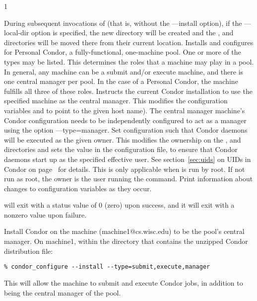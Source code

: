 \begin{ManPage}{\label{man-condor-configure}}{1}
\begin{Options}
{	During subsequent invocations of 
	(that is, without the ---install option),
	if the ---local-dir option is specified, the new directory
	will be created and the ,  and  
	directories will be moved there from their current location.}
	 {Installs and configures for 
	  Personal Condor, a fully-functional, one-machine pool}.
	 {One
	or more of the types may be listed.
	This determines the roles that a machine may play in a pool.
	In general, any machine can be a submit and/or execute machine,
	and there is one central manager per pool.
	In the case of a Personal Condor,
	the machine fulfills all three of these roles.}
	 {Instructs
	the current Condor installation to use the specified machine
	as the central manager. 
	This modifies the configuration variables 
	and  to point to the given host name).
	The central manager machine's Condor configuration needs
	to be independently configured to 
	act as a manager using the option ---type=manager. }
	 {Set configuration
	such that Condor daemons will be executed as the given owner.
	This modifies the 
	ownership on the ,  and 
	directories and sets the  value
	in the configuration file,
	to ensure that Condor daemons start up as the specified effective user.
	See section~\ref{sec:uids} on
        UIDs in Condor on page~\pageref{sec:uids} for details.
	This is only applicable when  is run by root.
	If not run as root, the owner is the user running
	the  command.  }
	 {Print information about changes
	to configuration variables as they occur.}
\end{Options}

\ExitStatus

 will exit with a status value of 0 (zero) upon success,
and it will exit with a nonzero value upon failure.

\Examples
Install Condor on the machine (machine1@cs.wisc.edu)
to be the pool's central manager.
On machine1,
within the directory that contains the unzipped Condor
distribution  file:
\footnotesize
\begin{verbatim}
% condor_configure --install --type=submit,execute,manager
\end{verbatim}
\normalsize
This will allow the machine to submit and execute Condor jobs, 
in addition to being the central manager of the pool.



\end{ManPage}
